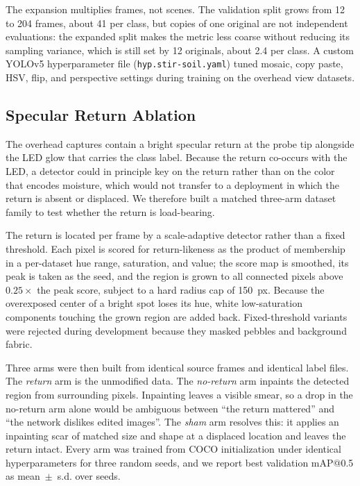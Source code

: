﻿\documentclass[journal]{IEEEtran}
\begin{document}
The expansion multiplies frames, not scenes. The validation split grows from 12 to 204 frames, about 41 per class, but copies of one original are not independent evaluations: the expanded split makes the metric less coarse without reducing its sampling variance, which is still set by 12 originals, about 2.4 per class. A custom YOLOv5 hyperparameter file (\texttt{hyp.stir-soil.yaml}) tuned mosaic, copy paste, HSV, flip, and perspective settings during training on the overhead view datasets.

\subsection{Specular Return Ablation}
\label{sec:ablation-method}
The overhead captures contain a bright specular return at the probe tip alongside the LED glow that carries the class label. Because the return co-occurs with the LED, a detector could in principle key on the return rather than on the color that encodes moisture, which would not transfer to a deployment in which the return is absent or displaced. We therefore built a matched three-arm dataset family to test whether the return is load-bearing.

The return is located per frame by a scale-adaptive detector rather than a fixed threshold. Each pixel is scored for return-likeness as the product of membership in a per-dataset hue range, saturation, and value; the score map is smoothed, its peak is taken as the seed, and the region is grown to all connected pixels above $0.25\times$ the peak score, subject to a hard radius cap of 150~px. Because the overexposed center of a bright spot loses its hue, white low-saturation components touching the grown region are added back. Fixed-threshold variants were rejected during development because they masked pebbles and background fabric.

Three arms were then built from identical source frames and identical label files. The \emph{return} arm is the unmodified data. The \emph{no-return} arm inpaints the detected region from surrounding pixels. Inpainting leaves a visible smear, so a drop in the no-return arm alone would be ambiguous between ``the return mattered'' and ``the network dislikes edited images''. The \emph{sham} arm resolves this: it applies an inpainting scar of matched size and shape at a displaced location and leaves the return intact. Every arm was trained from COCO initialization under identical hyperparameters for three random seeds, and we report best validation mAP@0.5 as mean~$\pm$~s.d. over seeds.
\end{document}
